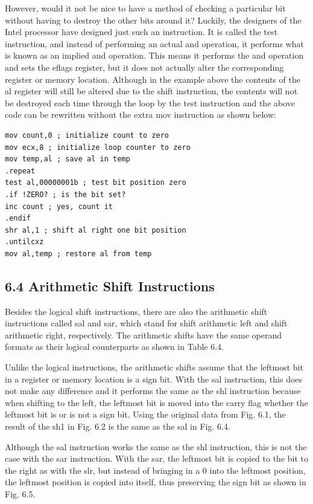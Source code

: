 \documentclass[10pt]{article}
\begin{document}
However, would it not be nice to have a method of checking a particular bit without having to destroy the other bits around it? Luckily, the designers of the Intel processor have designed just such an instruction. It is called the test instruction, and instead of performing an actual and operation, it performs what is known as an implied and operation. This means it performs the and operation and sets the eflags register, but it does not actually alter the corresponding register or memory location. Although in the example above the contents of the al register will still be altered due to the shift instruction, the contents will not be destroyed each time through the loop by the test instruction and the above code can be rewritten without the extra mov instruction as shown below:

\begin{verbatim}
mov count,0 ; initialize count to zero
mov ecx,8 ; initialize loop counter to zero
mov temp,al ; save al in temp
.repeat
test al,00000001b ; test bit position zero
.if !ZERO? ; is the bit set?
inc count ; yes, count it
.endif
shr al,1 ; shift al right one bit position
.untilcxz
mov al,temp ; restore al from temp
\end{verbatim}

\subsection*{6.4 Arithmetic Shift Instructions}
Besides the logical shift instructions, there are also the arithmetic shift instructions called sal and sar, which stand for shift arithmetic left and shift arithmetic right, respectively. The arithmetic shifts have the same operand formats as their logical counterparts as shown in Table 6.4.

Unlike the logical instructions, the arithmetic shifts assume that the leftmost bit in a register or memory location is a sign bit. With the sal instruction, this does not make any difference and it performs the same as the shl instruction because when shifting to the left, the leftmost bit is moved into the carry flag whether the leftmost bit is or is not a sign bit. Using the original data from Fig. 6.1, the result of the sh1 in Fig. 6.2 is the same as the sal in Fig. 6.4.

Although the sal instruction works the same as the shl instruction, this is not the case with the sar instruction. With the sar, the leftmost bit is copied to the bit to the right as with the slr, but instead of bringing in a 0 into the leftmost position, the leftmost position is copied into itself, thus preserving the sign bit as shown in Fig. 6.5.
\end{document}
